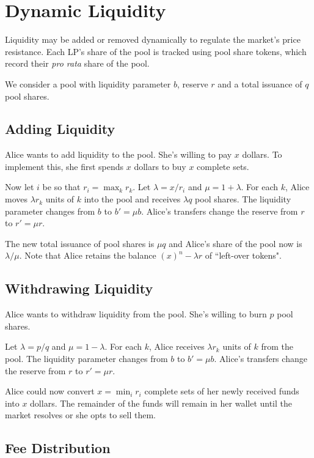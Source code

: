\documentclass[12pt]{article}
\begin{document}
\section{Dynamic Liquidity}

Liquidity may be added or removed dynamically to regulate the market's price resistance. Each LP's share of the pool is tracked using pool share tokens, which record their \emph{pro rata} share of the pool.

We consider a pool with liquidity parameter $b$, reserve $r$ and a total issuance of $q$ pool shares.

\subsection{Adding Liquidity}

Alice wants to add liquidity to the pool. She's willing to pay $x$ dollars. To implement this, she first spends $x$ dollars to buy $x$ complete sets.

Now let $i$ be so that $r_i = \max_k r_k$. Let $\lambda = x / r_i$ and $\mu = 1 + \lambda$. For each $k$, Alice moves $\lambda r_k$ units of $k$ into the pool and receives $\lambda q$ pool shares. The liquidity parameter changes from $b$ to $b' = \mu b$. Alice's transfers change the reserve from $r$ to $r' = \mu r$.

The new total issuance of pool shares is $\mu q$ and Alice's share of the pool now is $\lambda / \mu$. Note that Alice retains the balance $(x)^n - \lambda r$ of ``left-over tokens".

\subsection{Withdrawing Liquidity}

Alice wants to withdraw liquidity from the pool. She's willing to burn $p$ pool shares.

Let $\lambda = p / q$ and $\mu = 1 - \lambda$. For each $k$, Alice receives $\lambda r_k$ units of $k$ from the pool. The liquidity parameter changes from $b$ to $b' = \mu b$. Alice's transfers change the reserve from $r$ to $r' = \mu r$.

Alice could now convert $x = \min_i r_i$ complete sets of her newly received funds into $x$ dollars. The remainder of the funds will remain in her wallet until the market resolves or she opts to sell them.

\subsection{Fee Distribution}
\end{document}
